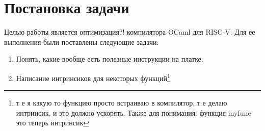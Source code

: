 
\section{Постановка задачи}
 \label{sec:task}
 Целью работы является оптимизация?! компилятора OCaml для RISC-V.
 Для ее выполнения были поставлены следующие задачи:
 \begin{enumerate}
    \item Понять, какие вообще есть полезные инструкции на платке.
    \item Написание интринсиков для некоторых функций\footnote{т е я какую то функцию
    просто встраиваю в компилятор, т е делаю интринсик, и это должно ускорять.
    Также для понимания: функция myfunc это теперь интринсик}
 \end{enumerate}
